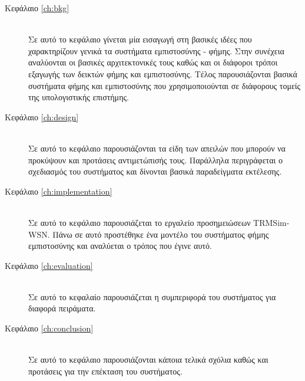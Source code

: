 \begin{description} \item[Κεφάλαιο \ref{ch:bkg}] \hfill \\
Σε αυτό το κεφάλαιο γίνεται μία εισαγωγή στη βασικές ιδέες που χαρακτηρίζουν γενικά τα συστήματα εμπιστοσύνης - φήμης. Στην συνέχεια αναλύονται οι βασικές αρχιτεκτονικές τους καθώς και οι διάφοροι τρόποι εξαγωγής των δεικτών φήμης και εμπιστοσύνης. Τέλος παρουσιάζονται βασικά συστήματα φήμης και εμπιστοσύνης που χρησιμοποιούνται σε διάφορους τομείς της υπολογιστικής επιστήμης.

\item[Κεφάλαιο \ref{ch:design}] \hfill \\
Σε αυτό το κεφάλαιο παρουσιάζονται τα είδη των απειλών που μπορούν να προκύψουν και προτάσεις αντιμετώπισής τους. Παράλληλα περιγράφεται ο σχεδιασμός του συστήματος και δίνονται βασικά παραδείγματα εκτέλεσης.

\item[Κεφάλαιο \ref{ch:implementation}] \hfill \\
Σε αυτό το κεφάλαιο παρουσιάζεται το εργαλείο προσημειώσεων TRMSim-WSN.
Πάνω σε αυτό προστέθηκε ένα μοντέλο του συστήματος φήμης εμπιστοσύνης και αναλύεται ο τρόπος που έγινε αυτό.

\item[Κεφάλαιο \ref{ch:evaluation}] \hfill \\
Σε αυτό το κεφαλαίο παρουσιάζεται η συμπεριφορά του συστήματος για διαφορά πειράματα.

\item[Κεφάλαιο \ref{ch:conclusion}] \hfill \\
Σε αυτό το κεφάλαιο παρουσιάζονται κάποια τελικά σχόλια καθώς και προτάσεις για την επέκταση του συστήματος.
\end{description}